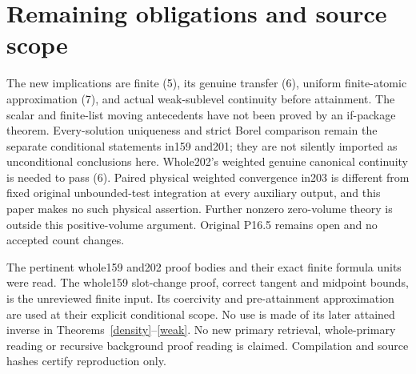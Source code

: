 \documentclass[11pt]{article}
\begin{document}
\section{Remaining obligations and source scope}
The new implications are finite (5), its genuine transfer (6),
uniform finite-atomic approximation (7), and actual weak-sublevel
continuity before attainment. The scalar and finite-list moving
antecedents have not been proved by an if-package theorem.
Every-solution uniqueness and strict Borel comparison remain the
separate conditional statements in159 and201; they are not silently
imported as unconditional conclusions here.
Whole202's weighted genuine canonical continuity is needed to
pass (6). Paired physical weighted convergence in203 is different
from fixed original unbounded-test integration at every auxiliary
output, and this paper makes no such physical assertion.
Further nonzero zero-volume theory is outside this positive-volume
argument. Original P16.5 remains open and no accepted count changes.

The pertinent whole159 and202 proof bodies and their exact finite
formula units were read. The whole159 slot-change proof, correct
tangent and midpoint bounds, is the unreviewed finite input.
Its coercivity and pre-attainment approximation are used at their
explicit conditional scope. No use is made of its later attained
inverse in Theorems~\ref{density}--\ref{weak}.
No new primary retrieval, whole-primary reading or recursive
background proof reading is claimed.
Compilation and source hashes certify reproduction only.
\end{document}
